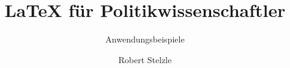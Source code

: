 

\title{\LaTeX\xspace für Politikwissenschaftler}
\subtitle{Anwendungsbeispiele}
\author{Robert Stelzle}




\usepackage[onehalfspacing]{setspace}   %

\usepackage{etoolbox}


\usepackage{amsmath}%
\usepackage{fontspec}%
\usepackage{libertinus}%
\usepackage{unicode-math} %
\setmonofont[Scale=MatchLowercase,
	FakeStretch=0.9]{Consolas}   %
\usepackage{nicefrac}


\usepackage{microtype} %
\usepackage{xspace} %

\usepackage{geometry} %
\geometry{lmargin=2.5cm, rmargin=3.5cm, tmargin=2.5cm, bmargin=2.5cm,
	includeheadfoot,} %

\usepackage[automark,
headsepline=1pt, footsepline=1pt,
]{scrlayer-scrpage} 
\ihead{\headmark}
\chead{}
\cfoot*{}


\usepackage{babel}%
\usepackage{csquotes}%




\usepackage[backend=biber, 
style=authoryear-ibid,minnames=1,maxnames=3,isbn=false,date=year, sorting=nyt]{biblatex}%





